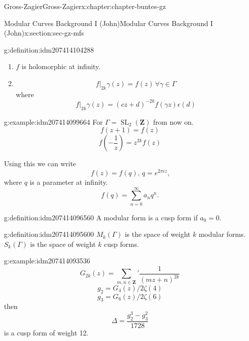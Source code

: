 \documentclass[oneside,10pt,]{book}
\numberwithin{equation}{section}
\newcommand{\ZZ}{\mathbf{Z}}
\DeclareMathOperator{\SL}{SL}
\begin{document}
\begin{chapterptx}{Gross-Zagier}{}{Gross-Zagier}{}{}{x:chapter:chapter-buntes-gz}
\begin{sectionptx}{Modular Curves Background I (John)}{}{Modular Curves Background I (John)}{}{}{x:section:sec-gz-mfs}
\begin{definition}{}{g:definition:idm207414104288}
\begin{enumerate}
\item{}\(f\) is holomorphic at infinity.%
\item{}%
\begin{equation*}
f|_{2k} \gamma (z) = f(z)\,\forall\gamma \in \Gamma 
\end{equation*}
where%
\begin{equation*}
f|_{2k} \gamma (z) = (cz+d)^{-2k}f(\gamma z)\epsilon (d)
\end{equation*}
%
\end{enumerate}
%
\end{definition}
\begin{example}{}{g:example:idm207414099664}%
For \(\Gamma =  \SL_2(\ZZ)\) from now on.%
\begin{equation*}
f(z+1) = f(z)
\end{equation*}
%
\begin{equation*}
f\left(-\frac 1z\right) = z^{2k}f(z)
\end{equation*}
%
\end{example}
Using this we can write%
\begin{equation*}
f(z) = f(q),\,q= e^{2\pi  i z}\text{,}
\end{equation*}
where \(q\) is a parameter at infinity.%
\begin{equation*}
f(q) = \sum_{n=0}^\infty a_n q^n\text{.}
\end{equation*}
%
\begin{definition}{}{g:definition:idm207414096560}%
A modular form is a cusp form if \(a_0 = 0\).%
\end{definition}
\begin{definition}{}{g:definition:idm207414095600}%
\(M_k(\Gamma )\) is the space of weight \(k\) modular forms. \(S_k(\Gamma )\) is the space of weight \(k\) cusp forms.%
\end{definition}
\begin{example}{}{g:example:idm207414093536}%
%
\begin{equation*}
G_{2k}(z) = \sum_{m,n\in \ZZ}' \frac{1}{(mz+n)^{2k}}
\end{equation*}
%
\begin{equation*}
g_{2} = G_4(z)/2\zeta (4)
\end{equation*}
%
\begin{equation*}
g_{3} = G_6(z)/2\zeta (6)
\end{equation*}
then%
\begin{equation*}
\Delta  = \frac{g_2^3 - g_3^2}{1728}
\end{equation*}
is a cusp form of weight 12.%

\end{example}
\end{sectionptx}
\end{chapterptx}
\end{document}
